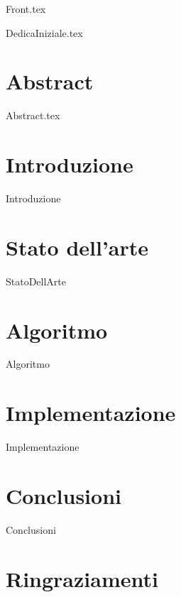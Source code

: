 \documentclass[12pt,onesidet]{report}
\begin{document}
	
	\begin{titlepage}
		{Front.tex}
	\end{titlepage}

	{DedicaIniziale.tex}
    
    
    \chapter*{Abstract}
    {Abstract.tex}
    
    \tableofcontents{}
    \listoftables
    \listoflistings
    \newpage
    
    
    \chapter{Introduzione}
    {Introduzione}
    
    \chapter{Stato dell'arte}
    {StatoDellArte}
    
    \chapter{Algoritmo}
    {Algoritmo}
    
    \chapter{Implementazione}
    {Implementazione}
    
    \chapter{Conclusioni}
     {Conclusioni}
     
    \chapter{Ringraziamenti}
    
     
    
    
\end{document}
